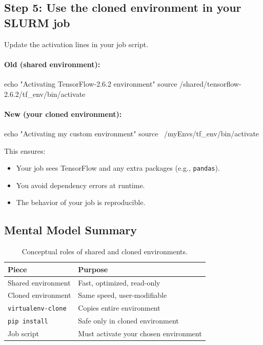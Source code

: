 \documentclass[11pt]{article}
\begin{document}
\subsection{Step 5: Use the cloned environment in your SLURM job}

Update the activation lines in your job script.

\paragraph{Old (shared environment):\\}
\begin{codeblock}
echo "Activating TensorFlow-2.6.2 environment"
source /shared/tensorflow-2.6.2/tf_env/bin/activate
\end{codeblock}

\paragraph{New (your cloned environment):\\}
\begin{codeblock}
echo "Activating my custom environment"
source ~/myEnvs/tf_env/bin/activate
\end{codeblock}

This ensures:
\begin{itemize}
  \item Your job sees TensorFlow and any extra packages (e.g., \texttt{pandas}).
  \item You avoid dependency errors at runtime.
  \item The behavior of your job is reproducible.
\end{itemize}

\subsection{Mental Model Summary}

\begin{table}[ht]
\centering
\begin{tabular}{@{}ll@{}}
\toprule
Piece               & Purpose                             \\
\midrule
Shared environment  & Fast, optimized, read-only          \\
Cloned environment  & Same speed, user-modifiable         \\
\texttt{virtualenv-clone} & Copies entire environment     \\
\texttt{pip install}      & Safe only in cloned environment \\
Job script          & Must activate your chosen environment \\
\bottomrule
\end{tabular}
\caption{Conceptual roles of shared and cloned environments.}
\label{tab:env-model}
\end{table}
\end{document}
